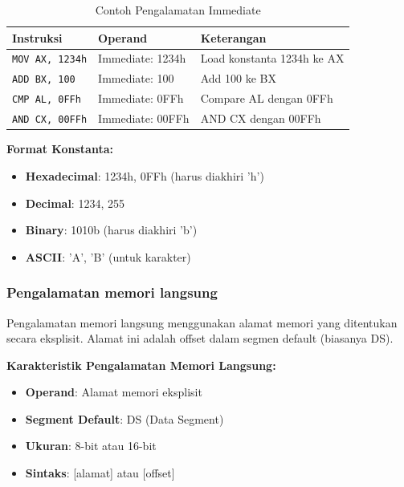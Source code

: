 \documentclass[../main.tex]{subfiles}
\begin{document}
\begin{table}[h]
\centering
\caption{Contoh Pengalamatan Immediate}
\begin{tabular}{|p{4cm}|p{4cm}|p{7cm}|}
\hline
\textbf{Instruksi} & \textbf{Operand} & \textbf{Keterangan} \\
\hline
\texttt{MOV AX, 1234h} & Immediate: 1234h & Load konstanta 1234h ke AX \\
\hline
\texttt{ADD BX, 100} & Immediate: 100 & Add 100 ke BX \\
\hline
\texttt{CMP AL, 0FFh} & Immediate: 0FFh & Compare AL dengan 0FFh \\
\hline
\texttt{AND CX, 00FFh} & Immediate: 00FFh & AND CX dengan 00FFh \\
\hline
\end{tabular}
\label{tab:immediate-addressing-examples}
\end{table}

\textbf{Format Konstanta:}
\begin{itemize}
    \item \textbf{Hexadecimal}: 1234h, 0FFh (harus diakhiri 'h')
    \item \textbf{Decimal}: 1234, 255
    \item \textbf{Binary}: 1010b (harus diakhiri 'b')
    \item \textbf{ASCII}: 'A', 'B' (untuk karakter)
\end{itemize}

\subsubsection{Pengalamatan memori langsung}
Pengalamatan memori langsung menggunakan alamat memori yang ditentukan secara eksplisit. Alamat ini adalah offset dalam segmen default (biasanya DS).

\textbf{Karakteristik Pengalamatan Memori Langsung:}
\begin{itemize}
    \item \textbf{Operand}: Alamat memori eksplisit
    \item \textbf{Segment Default}: DS (Data Segment)
    \item \textbf{Ukuran}: 8-bit atau 16-bit
    \item \textbf{Sintaks}: [alamat] atau [offset]
\end{itemize}
\end{document}
